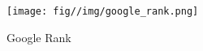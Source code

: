 \begin{figure}
    \centering
    \texttt{[image: fig//img/google\_rank.png]}
    \caption{Google Rank}
    \label{fig:google_rank}
\end{figure}
